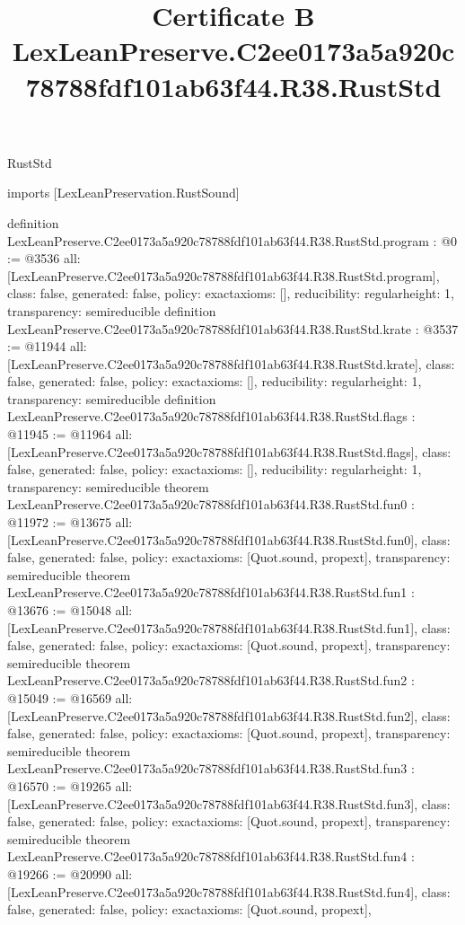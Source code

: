 \begin{lexlean}{RustStd}
\title{Certificate B LexLeanPreserve.C2ee0173a5a920c78788fdf101ab63f44.R38.RustStd}
\begin{coremodule}
imports [LexLeanPreservation.RustSound]

definition LexLeanPreserve.C2ee0173a5a920c78788fdf101ab63f44.R38.RustStd.program : @0 := @3536 {
  all: [LexLeanPreserve.C2ee0173a5a920c78788fdf101ab63f44.R38.RustStd.program],
  class: false,
  generated: false,
  policy: exact{axioms: []},
  reducibility: regular{height: 1},
  transparency: semireducible
}
definition LexLeanPreserve.C2ee0173a5a920c78788fdf101ab63f44.R38.RustStd.krate : @3537 := @11944 {
  all: [LexLeanPreserve.C2ee0173a5a920c78788fdf101ab63f44.R38.RustStd.krate],
  class: false,
  generated: false,
  policy: exact{axioms: []},
  reducibility: regular{height: 1},
  transparency: semireducible
}
definition LexLeanPreserve.C2ee0173a5a920c78788fdf101ab63f44.R38.RustStd.flags : @11945 := @11964 {
  all: [LexLeanPreserve.C2ee0173a5a920c78788fdf101ab63f44.R38.RustStd.flags],
  class: false,
  generated: false,
  policy: exact{axioms: []},
  reducibility: regular{height: 1},
  transparency: semireducible
}
theorem LexLeanPreserve.C2ee0173a5a920c78788fdf101ab63f44.R38.RustStd.fun0 : @11972 := @13675 {
  all: [LexLeanPreserve.C2ee0173a5a920c78788fdf101ab63f44.R38.RustStd.fun0],
  class: false,
  generated: false,
  policy: exact{axioms: [Quot.sound, propext]},
  transparency: semireducible
}
theorem LexLeanPreserve.C2ee0173a5a920c78788fdf101ab63f44.R38.RustStd.fun1 : @13676 := @15048 {
  all: [LexLeanPreserve.C2ee0173a5a920c78788fdf101ab63f44.R38.RustStd.fun1],
  class: false,
  generated: false,
  policy: exact{axioms: [Quot.sound, propext]},
  transparency: semireducible
}
theorem LexLeanPreserve.C2ee0173a5a920c78788fdf101ab63f44.R38.RustStd.fun2 : @15049 := @16569 {
  all: [LexLeanPreserve.C2ee0173a5a920c78788fdf101ab63f44.R38.RustStd.fun2],
  class: false,
  generated: false,
  policy: exact{axioms: [Quot.sound, propext]},
  transparency: semireducible
}
theorem LexLeanPreserve.C2ee0173a5a920c78788fdf101ab63f44.R38.RustStd.fun3 : @16570 := @19265 {
  all: [LexLeanPreserve.C2ee0173a5a920c78788fdf101ab63f44.R38.RustStd.fun3],
  class: false,
  generated: false,
  policy: exact{axioms: [Quot.sound, propext]},
  transparency: semireducible
}
theorem LexLeanPreserve.C2ee0173a5a920c78788fdf101ab63f44.R38.RustStd.fun4 : @19266 := @20990 {
  all: [LexLeanPreserve.C2ee0173a5a920c78788fdf101ab63f44.R38.RustStd.fun4],
  class: false,
  generated: false,
  policy: exact{axioms: [Quot.sound, propext]},
}
\end{coremodule}
\end{lexlean}
